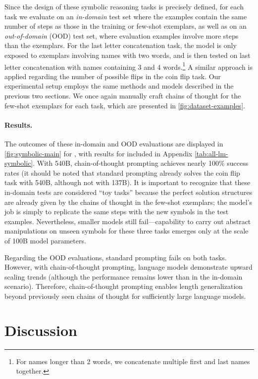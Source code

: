 Since the design of these symbolic reasoning tasks is precisely defined, for each task we evaluate on an \textit{in-domain} test set where the examples contain the same number of steps as those in the training or few-shot exemplars, as well as on an \textit{out-of-domain} (OOD) test set, where evaluation examples involve more steps than the exemplars. For the last letter concatenation task, the model is only exposed to exemplars involving names with two words, and is then tested on last letter concatenation with names containing 3 and 4 words.\footnote{For names longer than 2 words, we concatenate multiple first and last names together.} A similar approach is applied regarding the number of possible flips in the coin flip task. Our experimental setup employs the same methods and models described in the previous two sections. We once again manually craft chains of thought for the few-shot exemplars for each task, which are presented in \cref{fig:dataset-examples}.

\paragraph{Results.}
The outcomes of these in-domain and OOD evaluations are displayed in \cref{fig:symbolic-main} for \palm{}, with results for \lamda{} included in Appendix \cref{tab:all-lm-symbolic}. With \palm{} 540B, chain-of-thought prompting achieves nearly 100\% success rates (it should be noted that standard prompting already solves the coin flip task with \palm{} 540B, although not with \lamda{} 137B). It is important to recognize that these in-domain tests are considered ``toy tasks'' because the perfect solution structures are already given by the chains of thought in the few-shot exemplars; the model's job is simply to replicate the same steps with the new symbols in the test examples. Nevertheless, smaller models still fail—capability to carry out abstract manipulations on unseen symbols for these three tasks emerges only at the scale of 100B model parameters.

Regarding the OOD evaluations, standard prompting fails on both tasks. However, with chain-of-thought prompting, language models demonstrate upward scaling trends (although the performance remains lower than in the in-domain scenario). Therefore, chain-of-thought prompting enables length generalization beyond previously seen chains of thought for sufficiently large language models.

\section{Discussion}\label{sec:discussion}

